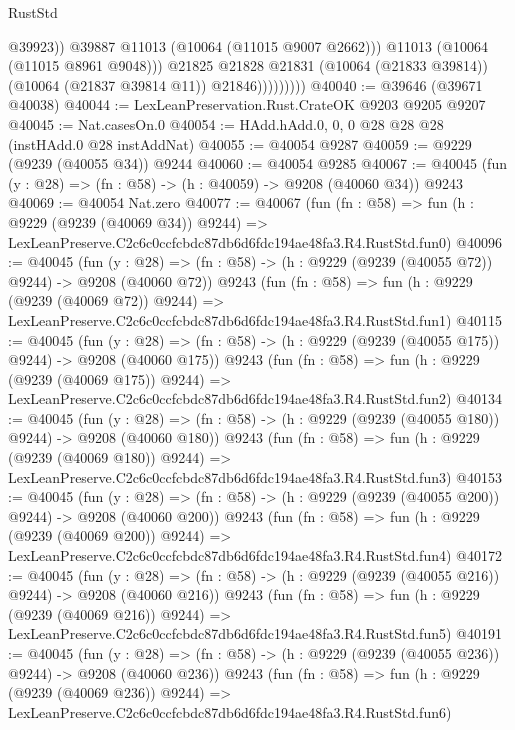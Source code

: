 \begin{lexlean}{RustStd}
\begin{coremodule}
                              @39923))
                          @39887
                          @11013
                          (@10064 (@11015 @9007 @2662)))
                        @11013
                        (@10064 (@11015 @8961 @9048)))
                      @21825
                      @21828
                      @21831
                      (@10064 (@21833 @39814))
                      (@10064 (@21837 @39814 @11))
                      @21846)))))))))
@40040 := @39646 (@39671 @40038)
@40044 := LexLeanPreservation.Rust.CrateOK @9203 @9205 @9207
@40045 := Nat.casesOn.{0}
@40054 := HAdd.hAdd.{0, 0, 0} @28 @28 @28 (instHAdd.{0} @28 instAddNat)
@40055 := @40054 @9287
@40059 := @9229 (@9239 (@40055 @34)) @9244
@40060 := @40054 @9285
@40067 := @40045 (fun (y : @28) => (fn : @58) -> (h : @40059) -> @9208 (@40060 @34)) @9243
@40069 := @40054 Nat.zero
@40077 := @40067
    (fun (fn : @58) =>
    fun (h : @9229 (@9239 (@40069 @34)) @9244) =>
    LexLeanPreserve.C2c6c0ccfcbdc87db6d6fdc194ae48fa3.R4.RustStd.fun0)
@40096 := @40045
    (fun (y : @28) => (fn : @58) -> (h : @9229 (@9239 (@40055 @72)) @9244) -> @9208 (@40060 @72))
    @9243
    (fun (fn : @58) =>
    fun (h : @9229 (@9239 (@40069 @72)) @9244) =>
    LexLeanPreserve.C2c6c0ccfcbdc87db6d6fdc194ae48fa3.R4.RustStd.fun1)
@40115 := @40045
    (fun (y : @28) => (fn : @58) -> (h : @9229 (@9239 (@40055 @175)) @9244) -> @9208 (@40060 @175))
    @9243
    (fun (fn : @58) =>
    fun (h : @9229 (@9239 (@40069 @175)) @9244) =>
    LexLeanPreserve.C2c6c0ccfcbdc87db6d6fdc194ae48fa3.R4.RustStd.fun2)
@40134 := @40045
    (fun (y : @28) => (fn : @58) -> (h : @9229 (@9239 (@40055 @180)) @9244) -> @9208 (@40060 @180))
    @9243
    (fun (fn : @58) =>
    fun (h : @9229 (@9239 (@40069 @180)) @9244) =>
    LexLeanPreserve.C2c6c0ccfcbdc87db6d6fdc194ae48fa3.R4.RustStd.fun3)
@40153 := @40045
    (fun (y : @28) => (fn : @58) -> (h : @9229 (@9239 (@40055 @200)) @9244) -> @9208 (@40060 @200))
    @9243
    (fun (fn : @58) =>
    fun (h : @9229 (@9239 (@40069 @200)) @9244) =>
    LexLeanPreserve.C2c6c0ccfcbdc87db6d6fdc194ae48fa3.R4.RustStd.fun4)
@40172 := @40045
    (fun (y : @28) => (fn : @58) -> (h : @9229 (@9239 (@40055 @216)) @9244) -> @9208 (@40060 @216))
    @9243
    (fun (fn : @58) =>
    fun (h : @9229 (@9239 (@40069 @216)) @9244) =>
    LexLeanPreserve.C2c6c0ccfcbdc87db6d6fdc194ae48fa3.R4.RustStd.fun5)
@40191 := @40045
    (fun (y : @28) => (fn : @58) -> (h : @9229 (@9239 (@40055 @236)) @9244) -> @9208 (@40060 @236))
    @9243
    (fun (fn : @58) =>
    fun (h : @9229 (@9239 (@40069 @236)) @9244) =>
    LexLeanPreserve.C2c6c0ccfcbdc87db6d6fdc194ae48fa3.R4.RustStd.fun6)

\end{coremodule}
\end{lexlean}
